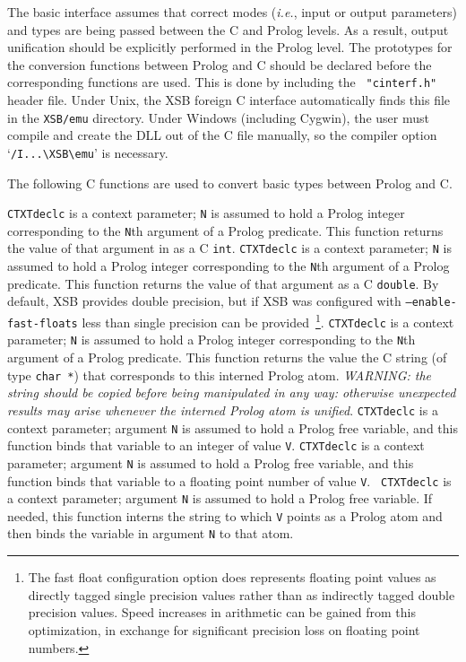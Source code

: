 The basic interface assumes that correct modes ({\it i.e.}, input or
output parameters) and types are being passed between the C and Prolog
levels.  As a result, output unification should be explicitly
performed in the Prolog level.  The prototypes for the conversion
functions between Prolog and C should be declared before the
corresponding functions are used.  This is done by including the {\tt
  "cinterf.h"} header file.  Under Unix, the XSB foreign C interface
automatically finds this file in the {\tt XSB/emu} directory. Under
Windows (including Cygwin), the user must compile and create the DLL
out of the C file manually, so the compiler option
`\verb|/I...\XSB\emu|' is necessary.

The following C functions are used to convert basic types between
Prolog and C.
\begin{description}
 {\tt CTXTdeclc} is a context
parameter; {\tt N} is assumed to hold a Prolog integer corresponding
to the {\tt N}th argument of a Prolog predicate.  This function
returns the value of that argument in as a C {\tt int}.
%
 {\tt CTXTdeclc} is a
context parameter; {\tt N} is assumed to hold a Prolog integer
corresponding to the {\tt N}th argument of a Prolog predicate.  This
function returns the value of that argument as a C {\tt double}.  By
default, XSB provides double precision, but if XSB was configured with
{\tt --enable-fast-floats} less than single precision can be
provided~\footnote{The fast float configuration option does represents
  floating point values as directly tagged single precision values
  rather than as indirectly tagged double precision values. Speed
  increases in arithmetic can be gained from this optimization, in
  exchange for significant precision loss on floating point numbers.}.
%
 {\tt CTXTdeclc} is a
context parameter; {\tt N} is assumed to hold a Prolog integer
corresponding to the {\tt N}th argument of a Prolog predicate.  This
function returns the value the C string (of type {\tt char *}) that
corresponds to this interned Prolog atom.  {\em WARNING: the string
  should be copied before being manipulated in any way: otherwise
  unexpected results may arise whenever the interned Prolog atom is
  unified}.
%
 {\tt CTXTdeclc} is a
context parameter; argument {\tt N} is assumed to hold a Prolog free
variable, and this function binds that variable to an integer of value
{\tt V}.
%
 {\tt CTXTdeclc} is a
context parameter; argument {\tt N} is assumed to hold a Prolog free
variable, and this function binds that variable to a floating point
number of value {\tt V}.
%
 {\tt
  CTXTdeclc} is a context parameter; argument {\tt N} is assumed to
hold a Prolog free variable.  If needed, this function interns the
string to which {\tt V} points as a Prolog atom and then binds the
variable in argument {\tt N} to that atom.
\end{description}


